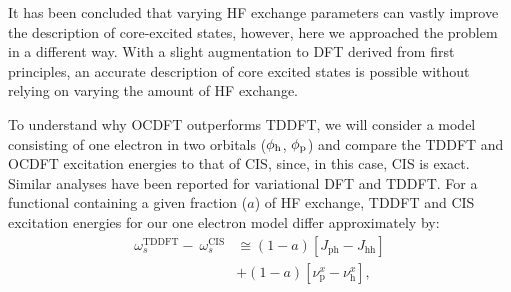 \documentclass[8.5pt,twoside,twocolumn]{article}
\begin{document}
It has been concluded that varying HF exchange parameters can vastly improve the description of core-excited states,\cite{heyd_hybrid_2003,nakata_time-dependent_2006,song_core-excitation_2008,henderson_importance_2007,henderson_assessment_2008} however, here we approached the problem in a different way. With a slight augmentation to DFT derived from first principles, an accurate description of core excited states is possible without relying on varying the amount of HF exchange.

To understand why OCDFT outperforms TDDFT, we will consider a model consisting of one electron in two orbitals ($\phi_{\rm h}$, $\phi_{\rm p}$) and compare the TDDFT and OCDFT excitation energies to that of CIS, since, in this case, CIS is exact. Similar analyses have been reported for variational DFT \cite{ziegler_implementation_2012} and TDDFT. \cite{casida_charge-transfer_2000} For a functional containing a given fraction ($a$) of HF exchange, TDDFT and CIS excitation energies for our one electron model differ approximately by:
\begin{align}
\label{eq:TDDFT_CIS}
 \nonumber \omega^{\text{TDDFT}}_s - \ \omega^{\text{CIS}}_s &\cong (1 - a) [J_{\text{ph}} - J_{\text{hh}}] \\ &+ (1 - a) [\nu_{\text{p}}^x - \nu_{\text{h}}^x] ,
\end{align}
\end{document}
